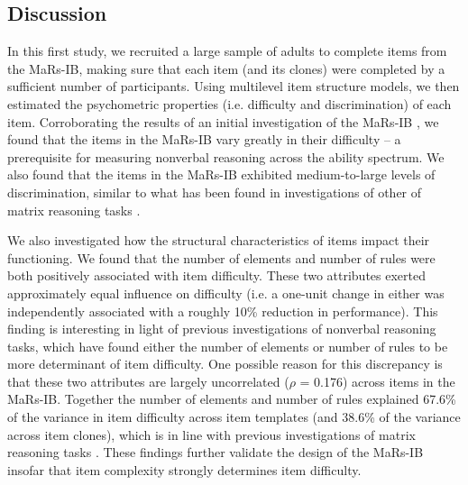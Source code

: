 \documentclass[a4paper,man,natbib]{apa6}
\begin{document}
\subsection{Discussion}

In this first study, we recruited a large sample of adults to complete items from the MaRs-IB, making sure that each item (and its clones) were completed by a sufficient number of participants. Using multilevel item structure models, we then estimated the psychometric properties (i.e. difficulty and discrimination) of each item. Corroborating the results of an initial investigation of the MaRs-IB \citep{chierchia2019matrix}, we found that the items in the MaRs-IB vary greatly in their difficulty -- a prerequisite for measuring nonverbal reasoning across the ability spectrum. We also found that the items in the MaRs-IB exhibited medium-to-large levels of discrimination, similar to what has been found in investigations of other of matrix reasoning tasks \citep{chiesi2012using, chiesi2012item, van2013shortened}.

We also investigated how the structural characteristics of items impact their functioning. We found that the number of elements and number of rules were both positively associated with item difficulty. These two attributes exerted approximately equal influence on difficulty (i.e. a one-unit change in either was independently associated with a roughly 10\% reduction in performance). This finding is interesting in light of previous investigations of nonverbal reasoning tasks, which have found either the number of elements \citep{bethell1984adaptive} or number of rules \citep{mulholland1980components} to be more determinant of item difficulty. One possible reason for this discrepancy is that these two attributes are largely uncorrelated ($\rho$ = 0.176) across items in the MaRs-IB. Together the number of elements and number of rules explained 67.6\% of the variance in item difficulty across item templates (and 38.6\% of the variance across item clones), which is in line with previous investigations of matrix reasoning tasks \citep{carpenter1990one, matzen1994error}. These findings further validate the design of the MaRs-IB insofar that item complexity strongly determines item difficulty.
\end{document}
